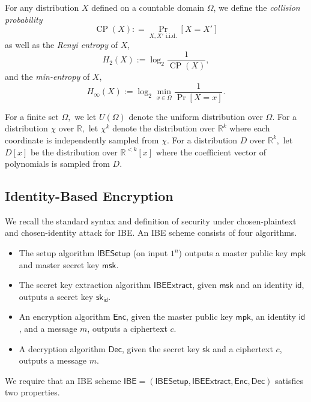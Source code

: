 \documentclass[11pt]{article}
\newcommand{\poly}[2]{{#1}^{<#2}[x]}
\newcommand{\R}{\mathbb{R}}
\newcommand{\Enc}{\mathsf{Enc}}
\newcommand{\Dec}{\mathsf{Dec}}
\newcommand{\sk}{\mathsf{sk}}
\newcommand{\msk}{\mathsf{msk}}
\newcommand{\mpk}{\mathsf{mpk}}
\newcommand{\id}{\mathsf{id}}
\newcommand{\Setup}{\mathsf{IBESetup}}
\newcommand{\Extract}{\mathsf{IBEExtract}}
\DeclareMathOperator{\cp}{CP}
\begin{document}
For any distribution $X$ defined on a countable domain $\Omega$, we define the \emph{collision probability} 
\[\cp(X): = \underset{X, X' \text{ i.i.d.}}{\Pr}[X = X']
\]
as well as the \emph{Renyi entropy} of $X$,
\[ H_2(X) := \log_2\frac 1 {\cp(X)},
\]
and the \emph{min-entropy} of $X$,
\[ H_\infty(X) := \log_2 \underset{x \in \Omega}{\min} \frac 1 { {\Pr} [X = x]}.
\]

For a finite set $\Omega,$ we let $U(\Omega)$ denote the uniform distribution over $\Omega.$ For a distribution $\chi$ over $\R,$ let $\chi^k$ denote the distribution over $\R^k$ where each coordinate is independently sampled from $\chi.$ For a distribution $D$ over $\R^k,$ let $D[x]$ be the distribution over $\poly{\R}{k}$ where the coefficient vector of polynomials is sampled from $D.$





\subsection{Identity-Based Encryption} \label{subsec:IBEdef}
We recall the standard syntax and definition of security under chosen-plaintext and chosen-identity attack \cite{BF03, ABC+05} for IBE. An IBE scheme consists of four algorithms.
\begin{itemize}
    \item  The setup algorithm $\Setup$ (on input $1^n$) outputs a master public key $\mpk$ and master secret key $\msk$.
    \item The secret key extraction algorithm $\Extract$, given $\msk$ and an identity $\id$, outputs a secret key $\sk_{\id}$.
    \item An encryption algorithm $\Enc$, given the master public key $\mpk$, an identity $\id$, and a message $m$, outputs a ciphertext $c$.
    \item  A decryption algorithm $\Dec$, given the secret key $\sk$ and a ciphertext $c$, outputs a message $m$.
\end{itemize}
We require that an IBE scheme $\mathsf{IBE} = (\Setup, \Extract, \Enc, \Dec)$ satisfies two properties.
\end{document}
